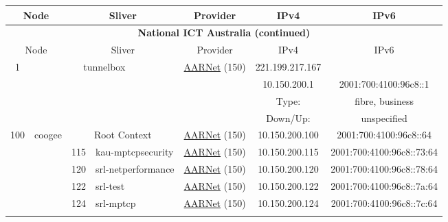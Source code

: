 \begin{small}
\begin{center}
\begin{longtable}{|c|c|c|c|c|c|c|c|}
 \multicolumn{2}{|p{8em}|}{Node} & \multicolumn{2}{|p{8em}|}{Sliver} & \multicolumn{2}{|p{8em}|}{Provider} & IPv4 & IPv6 \\ \hline
\endfirsthead
\hline
 \multicolumn{8}{|c|}{\textbf{National ICT Australia (continued)}} \\ \hline
 \multicolumn{2}{|p{8em}|}{Node} & \multicolumn{2}{|p{8em}|}{Sliver} & \multicolumn{2}{|p{8em}|}{Provider} & IPv4 & IPv6 \\ \hline
\endhead
 \multirow{4}{*}{\tiny{1}} & \multicolumn{3}{|c|}{\multirow{4}{*}{\tiny{tunnelbox}}} & \multicolumn{2}{|c|}{\multirow{4}{*}{\tiny{\href{https://www.aarnet.edu.au/}{AARNet} (150)}}} & \tiny{221.199.217.167} & \frownie{} \\* \cline{7-7}\cline{8-8}
  & \multicolumn{3}{|c|}{} & \multicolumn{2}{|c|}{} & \tiny{10.150.200.1} & \tiny{2001:700:4100:96c8::1} \\* \cline{7-7}\cline{8-8}
  & \multicolumn{3}{|c|}{} & \multicolumn{2}{|c|}{} & Type: & fibre, business \\* \cline{7-7}\cline{8-8}
  & \multicolumn{3}{|c|}{} & \multicolumn{2}{|c|}{} & Down/Up:  & unspecified \\ \hline
 \multirow{27}{*}{\tiny{100}} & \multicolumn{1}{|l|}{\multirow{27}{*}{\tiny{coogee}}} & \multicolumn{2}{|c|}{\tiny{Root Context}} & \multicolumn{2}{|c|}{\tiny{\href{https://www.aarnet.edu.au/}{AARNet} (150)}} & \tiny{10.150.200.100} & \tiny{2001:700:4100:96c8::64} \\* \cline{3-3}\cline{4-4}\cline{5-5}\cline{6-6}\cline{7-7}\cline{8-8}
  &  & \tiny{115} & \multicolumn{1}{|l|}{\tiny{kau-mptcpsecurity}} & \multicolumn{2}{|c|}{\tiny{\href{https://www.aarnet.edu.au/}{AARNet} (150)}} & \tiny{10.150.200.115} & \tiny{2001:700:4100:96c8::73:64} \\* \cline{3-3}\cline{4-4}\cline{5-5}\cline{6-6}\cline{7-7}\cline{8-8}
  &  & \tiny{120} & \multicolumn{1}{|l|}{\tiny{srl-netperformance}} & \multicolumn{2}{|c|}{\tiny{\href{https://www.aarnet.edu.au/}{AARNet} (150)}} & \tiny{10.150.200.120} & \tiny{2001:700:4100:96c8::78:64} \\* \cline{3-3}\cline{4-4}\cline{5-5}\cline{6-6}\cline{7-7}\cline{8-8}
  &  & \tiny{122} & \multicolumn{1}{|l|}{\tiny{srl-test}} & \multicolumn{2}{|c|}{\tiny{\href{https://www.aarnet.edu.au/}{AARNet} (150)}} & \tiny{10.150.200.122} & \tiny{2001:700:4100:96c8::7a:64} \\* \cline{3-3}\cline{4-4}\cline{5-5}\cline{6-6}\cline{7-7}\cline{8-8}
  &  & \tiny{124} & \multicolumn{1}{|l|}{\tiny{srl-mptcp}} & \multicolumn{2}{|c|}{\tiny{\href{https://www.aarnet.edu.au/}{AARNet} (150)}} & \tiny{10.150.200.124} & \tiny{2001:700:4100:96c8::7c:64} \\* \cline{3-3}\cline{4-4}\cline{5-5}\cline{6-6}\cline{7-7}\cline{8-8}

\end{longtable}
\end{center}
\end{small}
